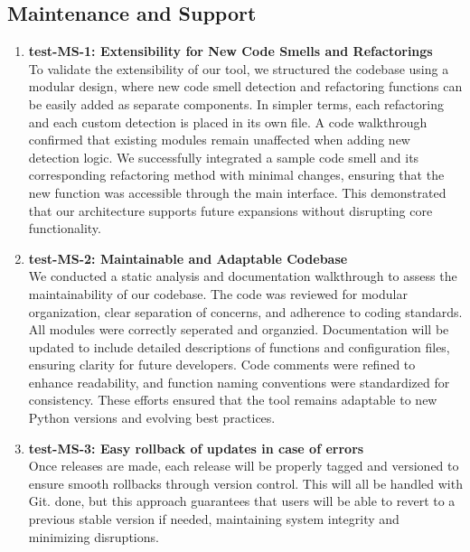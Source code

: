 \documentclass[12pt, titlepage]{article}
\begin{document}
\subsection{Maintenance and Support}
\begin{enumerate}

  \item \textbf{test-MS-1: Extensibility for New Code Smells and
    Refactorings} \\[2mm]
    To validate the extensibility of our tool, we structured the
    codebase using a modular design, where new code smell detection
    and refactoring functions can
    be easily added as separate components. In simpler terms, each
    refactoring and each custom detection is placed in its own file.
    A code walkthrough confirmed that
    existing modules remain unaffected when adding new detection
    logic. We successfully integrated a sample code smell and its
    corresponding refactoring method with
    minimal changes, ensuring that the new function was accessible
    through the main interface. This demonstrated that our
    architecture supports future expansions without
    disrupting core functionality.

  \item \textbf{test-MS-2: Maintainable and Adaptable Codebase} \\[2mm]
    We conducted a static analysis and documentation walkthrough to
    assess the maintainability of our codebase. The code was reviewed
    for modular organization, clear separation
    of concerns, and adherence to coding standards. All modules were
    correctly seperated and organzied. Documentation will be updated
    to include detailed descriptions of functions
    and configuration files, ensuring clarity for future developers.
    Code comments were refined to enhance readability, and function
    naming conventions were standardized for
    consistency. These efforts ensured that the tool remains
    adaptable to new Python versions and evolving best practices.

  \item \textbf{test-MS-3: Easy rollback of updates in case of errors} \\[2mm]
    Once releases are made, each release will be properly tagged and
    versioned to ensure smooth rollbacks through version control.
    This will all be handled with Git. done, but
    this approach guarantees that users will be able to revert to a
    previous stable version if needed, maintaining system integrity
    and minimizing disruptions.
\end{enumerate}
\end{document}
